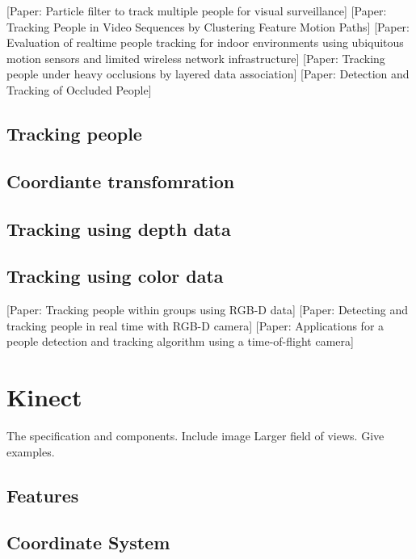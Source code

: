 \documentclass{sigchi}
\begin{document}
[Paper: Particle filter to track multiple people for visual surveillance]
[Paper: Tracking People in Video Sequences by Clustering Feature Motion Paths]
[Paper: Evaluation of realtime people tracking for indoor environments using ubiquitous motion sensors and limited wireless network infrastructure]
[Paper: Tracking people under heavy occlusions by layered data association]
[Paper: Detection and Tracking of Occluded People]

\subsection{Tracking people}

\subsection{Coordiante transfomration}

\cite{wei_kinect_calibration}
\cite{eggert_four_algorithms}
\cite{horn_unit_quaternions}

\subsection{Tracking using depth data}

\subsection{Tracking using color data}

[Paper: Tracking people within groups using RGB-D data]
[Paper: Detecting and tracking people in real time with RGB-D camera]
[Paper: Applications for a people detection and tracking algorithm using a time-of-flight camera]

\section{Kinect}

The specification and components. Include image Larger field of views. Give examples.

\subsection{Features}

\subsection{Coordinate System}
\end{document}
